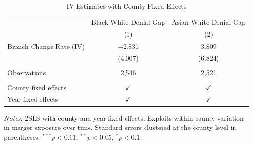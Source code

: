 
\begin{table}[htbp]
   \caption{\label{tab:county_fe} IV Estimates with County Fixed Effects}
   \bigskip
   \centering
   \begin{tabular}{lcc}
      \toprule
                                  & Black-White Denial Gap & Asian-White Denial Gap\\
                                  & (1)                    & (2)\\
      \midrule
      Branch Change Rate (IV)     & $-$2.831               & 3.809\\
                                  & (4.007)                & (6.824)\\
       \\
      Observations                & 2,546                  & 2,521\\
       \\
      County fixed effects        & $\checkmark$           & $\checkmark$\\
      Year fixed effects          & $\checkmark$           & $\checkmark$\\
      \bottomrule
   \end{tabular}

   \par \raggedright \small
   \textit{Notes:} 2SLS with county and year fixed effects. Exploits within-county variation in merger exposure over time. Standard errors clustered at the county level in parentheses. $^{***}p<0.01$, $^{**}p<0.05$, $^{*}p<0.1$.
\end{table}

